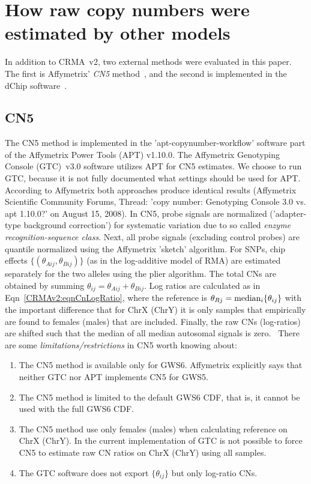 \documentclass[10pt,a4paper]{article}
\newcommand{\GWSSix}{GWS6\xspace}
\DeclareMathOperator{\median}{\textnormal{median}}
\begin{document}
\clearpage
\section{How raw copy numbers were estimated by other models}
\label{secOtherMethods}
In addition to CRMA~v2, two external methods were evaluated in this paper.  The first is Affymetrix' \emph{CN5} method~\citep{Affymetrix_2008m}, and the second is implemented in the dChip software~\citep{LiWong_2001}.

\subsection{CN5}
The CN5 method is implemented in the 'apt-copynumber-workflow' software part of the Affymetrix Power Tools (APT) v1.10.0.  The Affymetrix Genotyping Console (GTC)~v3.0 software \citep{Affymetrix_2008m} utilizes APT for CN5 estimates.  We choose to run GTC, because it is not fully documented what settings should be used for APT.  According to Affymetrix both approaches produce identical results (Affymetrix Scientific Community Forums, Thread: 'copy number: Genotyping Console 3.0 vs. apt 1.10.0?' on August 15, 2008).
In CN5, probe signals are normalized ('adapter-type background correction') for systematic variation due to so called \emph{enzyme recognition-sequence class}.   Next, all probe signals (excluding control probes) are quantile normalized using the Affymetrix 'sketch' algorithm.  For SNPs, chip effects $\{(\theta_{Aij}, \theta_{Bij})\}$ (as in the log-additive model of RMA) are estimated separately  for the two alleles using the plier algorithm.  The total CNs are obtained by summing $\theta_{ij}=\theta_{Aij}+\theta_{Bij}$.
Log ratios are calculated as in Eqn~\eqref{CRMAv2:eqnCnLogRatio}, where the reference is $\theta_{Rj}=\median_i\{\theta_{ij}\}$ with the important difference that for ChrX (ChrY) it is only samples that empirically are found to females (males) that are included.  Finally, the raw CNs (log-ratios) are shifted such that the median of all median autosomal signals is zero.~\citep{Affymetrix_2008m}
There are some \emph{limitations/restrictions} in CN5 worth knowing about:
\begin{enumerate}
\item The CN5 method is available only for \GWSSix.  Affymetrix explicitly says that neither GTC nor APT implements CN5 for GWS5.
\item The CN5 method is limited to the default GWS6 CDF, that is, it cannot be used with the full GWS6 CDF.
\item The CN5 method use only females (males) when calculating reference on ChrX (ChrY).  In the current implementation of GTC is not possible to force CN5 to estimate raw CN ratios on ChrX (ChrY) using all samples.
\item The GTC software does not export $\{\theta_{ij}\}$ but only log-ratio CNs.
\end{enumerate}
\end{document}
